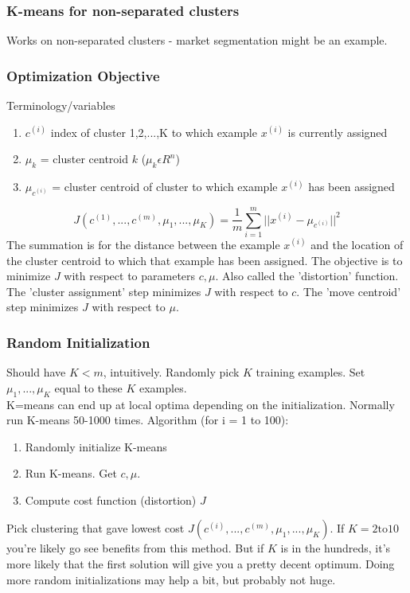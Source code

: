 \documentclass[11pt,letterpaper]{article}
\begin{document}
\subsubsection{K-means for non-separated clusters}
Works on non-separated clusters - market segmentation might be an example.

\subsubsection{Optimization Objective}
Terminology/variables
\begin{enumerate}
	\item $c^{(i)}$ index of cluster {1,2,...,K} to which example $x^{(i)}$ is currently assigned
	\item $\mu_k$ = cluster centroid $k$ ($\mu_k \epsilon R^n$)	
	\item $\mu_{c^{(i)}}$ = cluster centroid of cluster to which example $x^{(i)}$ has been assigned
\end{enumerate}
$$J(c^{(1)},...,c^{(m)}, \mu_1,...,\mu_K) = \frac{1}{m}\sum_{i=1}^{m}||x^{(i)} - \mu_{c^{(i)}}||^2$$ The summation is for the distance between the example $x^{(i)}$ and the location of the cluster centroid to which that example has been assigned. The objective is to minimize $J$ with respect to parameters $c, \mu$. Also called the 'distortion' function. The 'cluster assignment' step minimizes $J$ with respect to $c$. The 'move centroid' step minimizes $J$ with respect to $\mu$.

\subsubsection{Random Initialization}
Should have $K < m$, intuitively. Randomly pick $K$ training examples. Set $\mu_1,...,\mu_K$ equal to these $K$ examples.\\
K=means can end up at local optima depending on the initialization. Normally run K-means 50-1000 times. Algorithm (for i = 1 to 100):
\begin{enumerate}
	\item Randomly initialize K-means
	\item Run K-means. Get $c, \mu$.
	\item Compute cost function (distortion) $J$
\end{enumerate}
Pick clustering that gave lowest cost $J(c^{(i)},...,c^{(m)}, \mu_1,...,\mu_K)$. If $K = 2 \textrm{to} 10$ you're likely go see benefits from this method. But if $K$ is in the hundreds, it's more likely that the first solution will give you a pretty decent optimum. Doing more random initializations may help a bit, but probably not huge.
\end{document}
